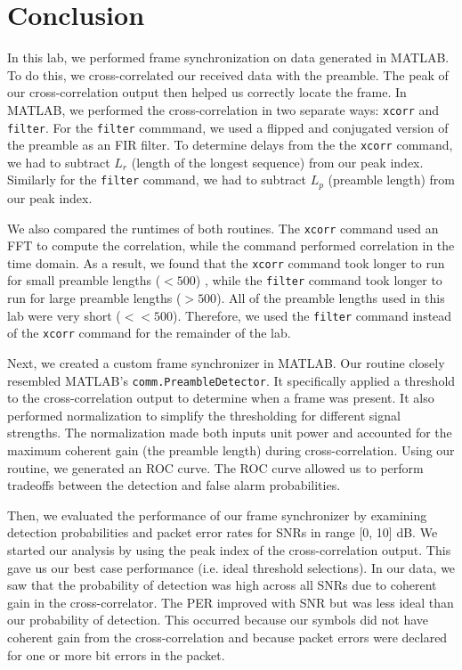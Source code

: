 \documentclass{article}
\begin{document}
\section{Conclusion}

In this lab, we performed frame synchronization on data generated in MATLAB. To do this, we cross-correlated our received data with the preamble. The peak of our cross-correlation output then helped us correctly locate the frame. In MATLAB, we performed the cross-correlation in two separate ways: \texttt{xcorr} and \texttt{filter}. For the \texttt{filter} commmand, we used a flipped and conjugated version of the preamble as an FIR filter. To determine delays from the the \texttt{xcorr} command, we had to subtract $L_r$ (length of the longest sequence) from our peak index. Similarly for the \texttt{filter} command, we had to subtract $L_p$ (preamble length) from our peak index.

We also compared the runtimes of both routines. The \texttt{xcorr} command used an FFT to compute the correlation, while the  command performed correlation in the time domain. As a result, we found that the \texttt{xcorr} command took longer to run for small preamble lengths ($ < 500$) , while the \texttt{filter} command took longer to run for large preamble lengths ($ > 500$). All of the preamble lengths used in this lab were very short ($ << 500$). Therefore, we used the \texttt{filter} command instead of the \texttt{xcorr} command for the remainder of the lab.

Next, we created a custom frame synchronizer in MATLAB. Our routine closely resembled MATLAB's \texttt{comm.PreambleDetector}. It specifically applied a threshold to the cross-correlation output to determine when a frame was present. It also performed normalization to simplify the thresholding for different signal strengths. The normalization made both inputs unit power and accounted for the maximum coherent gain (the preamble length) during cross-correlation. Using our routine, we generated an ROC curve. The ROC curve allowed us to perform tradeoffs between the detection and false alarm probabilities.

Then, we evaluated the performance of our frame synchronizer by examining detection probabilities and packet error rates for SNRs in range [0, 10] dB. We started our analysis by using the peak index of the cross-correlation output. This gave us our best case performance (i.e. ideal threshold selections). In our data, we saw that the probability of detection was high across all SNRs due to coherent gain in the cross-correlator. The PER improved with SNR but was less ideal than our probability of detection. This occurred because our symbols did not have coherent gain from the cross-correlation and because packet errors were declared for one or more bit errors in the packet.
\end{document}
